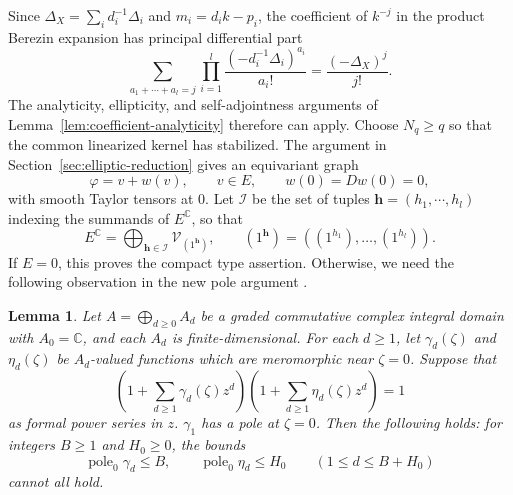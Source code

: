 \documentclass[11pt,reqno]{amsart}
\newtheorem{lemma}[theorem]{Lemma}
\theoremstyle{corollary}
\theoremstyle{conjecture}
\theoremstyle{assumption}
\theoremstyle{proposition}
\theoremstyle{remark}
\numberwithin{equation}{section}
\begin{document}
Since $\Delta_X=\sum_i d_i^{-1}\Delta_i$ and $m_i=d_i k-p_i$, the coefficient of $k^{-j}$ in the product Berezin expansion has principal differential part
\[
\sum_{a_1+\cdots+a_l=j}\prod_{i=1}^{l}\frac{(-d_i^{-1}\Delta_i)^{a_i}}{a_i!}=\frac{(-\Delta_X)^j}{j!}.
\]
The analyticity, ellipticity, and self-adjointness arguments of Lemma~\ref{lem:coefficient-analyticity} therefore can apply. Choose $N_q\geq q$ so that the common linearized kernel has stabilized. The argument in Section~\ref{sec:elliptic-reduction} gives an equivariant graph
\[
\varphi=v+w(v),\qquad v\in E,\qquad w(0)=Dw(0)=0,
\]
with smooth Taylor tensors at $0$. Let $\mathcal I$ be the set of tuples $\mathbf h=(h_1,\cdots,h_l)$ indexing the summands of
$E^{\mathbb C}$, so that
\[
E^{\mathbb C}=\bigoplus_{\mathbf h\in\mathcal I}\mathcal V_{(1^{\mathbf h})},\qquad (1^{\mathbf h})=((1^{h_1}),\ldots,(1^{h_l})).
\]
If $E=0$, this proves the compact type assertion. Otherwise, we need the following observation in the new pole argument .

\begin{lemma}\label{lem:prod-inverse-series}
Let $A=\bigoplus_{d\geq0}A_d$ be a graded commutative complex integral domain with $A_0=\mathbb C$, and each $A_d$ is finite-dimensional. For each $d\geq1$, let $\gamma_d(\zeta)$ and $\eta_d(\zeta)$ be $A_d$-valued functions which are meromorphic near $\zeta=0$. Suppose that
\[
\left(1+\sum_{d\geq1}\gamma_d(\zeta)z^d\right)\left(1+\sum_{d\geq1}\eta_d(\zeta)z^d\right)=1
\]
as formal power series in $z$. $\gamma_1$ has a pole at $\zeta=0$. Then the following holds: for integers $B\geq1$ and $H_0\geq0$, the bounds
\[
\operatorname{pole}_0\gamma_d\leq B,\qquad \operatorname{pole}_0\eta_d\leq H_0
\qquad (1\leq d\leq B+H_0)
\]
cannot all hold.
\end{lemma}
\end{document}
